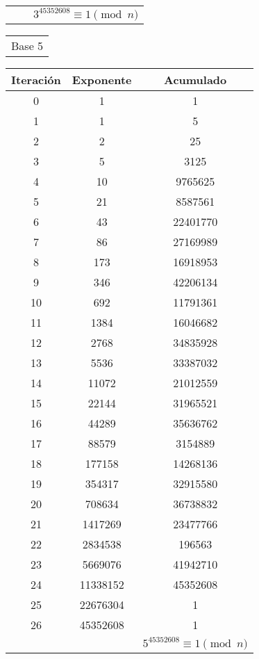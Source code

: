 \documentclass[fleqn]{article}
\begin{document}
\begin{center}
\begin{tabular}{c | c | c}
            && $ 3^{45352608} \equiv  1 \pmod{n} $
        \end{tabular}
        \newpage
        \begin{tabular}{c}
            Base 5 \\
        \end{tabular}
        \begin{tabular}{c | c | c}
            Iteración & Exponente & Acumulado \\ \hline
            0 & 1 & 1 \\
            1 & 1 & 5 \\
            2 & 2 & 25 \\
            3 & 5 & 3125 \\
            4 & 10 & 9765625 \\
            5 & 21 & 8587561 \\
            6 & 43 & 22401770 \\
            7 & 86 & 27169989 \\
            8 & 173 & 16918953 \\
            9 & 346 & 42206134 \\
            10 & 692 & 11791361 \\
            11 & 1384 & 16046682 \\
            12 & 2768 & 34835928 \\
            13 & 5536 & 33387032 \\
            14 & 11072 & 21012559 \\
            15 & 22144 & 31965521 \\
            16 & 44289 & 35636762 \\
            17 & 88579 & 3154889 \\
            18 & 177158 & 14268136 \\
            19 & 354317 & 32915580 \\
            20 & 708634 & 36738832 \\
            21 & 1417269 & 23477766 \\
            22 & 2834538 & 196563 \\
            23 & 5669076 & 41942710 \\
            24 & 11338152 & 45352608 \\
            25 & 22676304 & 1 \\
            26 & 45352608 & 1 \\ \hline
            && $5^{45352608} \equiv  1 \pmod{n}$
        \end{tabular}

\end{center}
\end{document}
